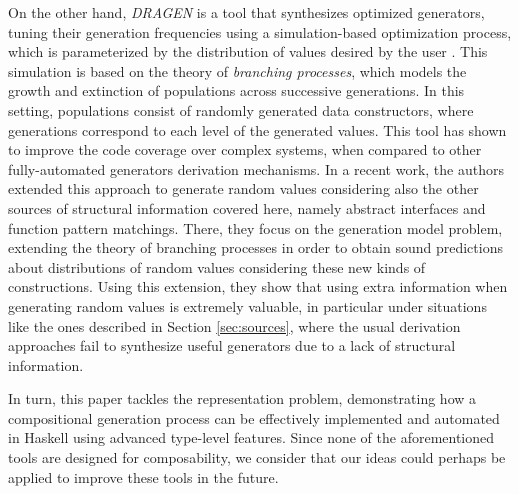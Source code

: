 On the other hand, \emph{DRAGEN} is a tool that synthesizes optimized
generators, tuning their generation frequencies using a simulation-based
optimization process, which is parameterized by the distribution of values
desired by the user \cite{DBLP:conf/haskell/MistaRH18}.
%
This simulation is based on the theory of \emph{branching processes}, which
models the growth and extinction of populations across successive generations.
%
In this setting, populations consist of randomly generated data constructors,
where generations correspond to each level of the generated values.
%
This tool has shown to improve the code coverage over complex systems, when
compared to other fully-automated generators derivation mechanisms.
%
In a recent work, the authors extended this approach to generate random values
considering also the other sources of structural information covered here,
namely abstract interfaces and function pattern matchings.
%
There, they focus on the generation model problem, extending the theory of
branching processes in order to obtain sound predictions about distributions of
random values considering these new kinds of constructions.
%
Using this extension, they show that using extra information when generating
random values is extremely valuable, in particular under situations like the
ones described in Section \ref{sec:sources}, where the usual derivation
approaches fail to synthesize useful generators due to a lack of structural
information.


In turn, this paper tackles the representation problem, demonstrating how a
compositional generation process can be effectively implemented and automated in
Haskell using advanced type-level features.
%
Since none of the aforementioned tools are designed for composability, we
consider that our ideas could perhaps be applied to improve these tools in the
future.
